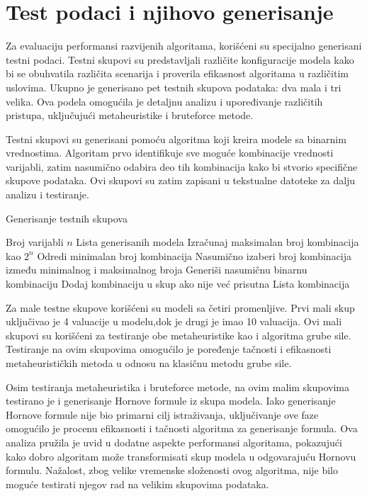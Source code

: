 \documentclass[12pt,oneside]{memoir}
\begin{document}
\section{Test podaci i njihovo generisanje}

Za evaluaciju performansi razvijenih algoritama, korišćeni su specijalno generisani testni podaci. Testni skupovi su predstavljali različite konfiguracije modela kako bi se obuhvatila različita scenarija i proverila efikasnost algoritama u različitim uslovima. Ukupno je generisano pet testnih skupova podataka: dva mala i tri velika. Ova podela omogućila je detaljnu analizu i upoređivanje različitih pristupa, uključujući metaheuristike i bruteforce metode.

Testni skupovi su generisani pomoću algoritma koji kreira modele sa binarnim vrednostima. Algoritam prvo identifikuje sve moguće kombinacije vrednosti varijabli, zatim nasumično odabira deo tih kombinacija kako bi stvorio specifične skupove podataka. Ovi skupovi su zatim zapisani u tekstualne datoteke za dalju analizu i testiranje. 

\begin{algorithm}[H]
\caption{Generisanje testnih skupova}
\renewcommand{\algorithmicrequire}{\textbf{Input:}}
\renewcommand{\algorithmicensure}{\textbf{Output:}}
\begin{algorithmic}[1]
\REQUIRE Broj varijabli \( n \)
\ENSURE Lista generisanih modela
\STATE Izračunaj maksimalan broj kombinacija kao \(2^n\)
\STATE Odredi minimalan broj kombinacija
\STATE Nasumično izaberi broj kombinacija između minimalnog i maksimalnog broja
    \STATE Generiši nasumičnu binarnu kombinaciju
    \STATE Dodaj kombinaciju u skup ako nije već prisutna
\ENDWHILE
\RETURN Lista kombinacija
\end{algorithmic}
\end{algorithm}

Za male testne skupove korišćeni su modeli sa četiri promenljive. Prvi mali skup uključivao je 4 valuacije u modelu,dok je drugi je imao 10 valuacija. Ovi mali skupovi su korišćeni za testiranje obe metaheuristike kao i algoritma grube sile. Testiranje na ovim skupovima omogućilo je poređenje tačnosti i efikasnosti metaheurističkih metoda u odnosu na klasičnu metodu grube sile. 

Osim testiranja metaheuristika i bruteforce metode, na ovim malim skupovima testirano je i generisanje Hornove formule iz skupa modela. Iako generisanje Hornove formule nije bio primarni cilj istraživanja, uključivanje ove faze omogućilo je procenu efikasnosti i tačnosti algoritma za generisanje formula. Ova analiza pružila je uvid u dodatne aspekte performansi algoritama, pokazujući kako dobro algoritam može transformisati skup modela u odgovarajuću Hornovu formulu. Nažalost, zbog velike vremenske složenosti ovog algoritma, nije bilo moguće testirati njegov rad na velikim skupovima podataka.
\end{document}

